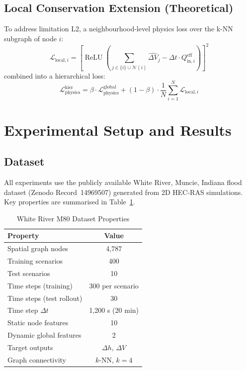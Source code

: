 \documentclass[conference]{IEEEtran}
\DeclareMathOperator{\ReLU}{ReLU}
\begin{document}
\subsection{Local Conservation Extension (Theoretical)}
To address limitation L2, a neighbourhood-level physics loss over the k-NN
subgraph of node $i$:
\begin{equation}
  \mathcal{L}_{\text{local},i} = \left[\ReLU\!\left(
    \sum_{j\in\{i\}\cup\mathcal{N}(i)}\hat{\Delta V}_j
    - \Delta t\cdot Q_{\text{in},i}^{\text{eff}}
  \right)\right]^2
\end{equation}
combined into a hierarchical loss:
\begin{equation}
  \mathcal{L}_{\text{physics}}^{\text{hier}} =
    \beta\cdot\mathcal{L}_{\text{physics}}^{\text{global}}
    + (1-\beta)\cdot\frac{1}{N}\sum_{i=1}^{N}\mathcal{L}_{\text{local},i}
\end{equation}

\section{Experimental Setup and Results}
\label{sec:exp}

\subsection{Dataset}
All experiments use the publicly available White River, Muncie, Indiana
flood dataset \cite{dataset2025} (Zenodo Record~14969507) generated from
2D HEC-RAS simulations. Key properties are summarised in
Table~\ref{tab:dataset}.

\begin{table}[htbp]
\caption{White River M80 Dataset Properties}
\label{tab:dataset}
\centering
\begin{tabular}{lc}
\toprule
\textbf{Property} & \textbf{Value} \\
\midrule
Spatial graph nodes       & 4,787 \\
Training scenarios        & 400 \\
Test scenarios            & 10 \\
Time steps (training)     & 300 per scenario \\
Time steps (test rollout) & 30 \\
Time step $\Delta t$      & 1,200 s (20 min) \\
Static node features      & 10 \\
Dynamic global features   & 2 \\
Target outputs            & $\Delta h$, $\Delta V$ \\
Graph connectivity        & $k$-NN, $k=4$ \\
\bottomrule
\end{tabular}
\end{table}
\end{document}
